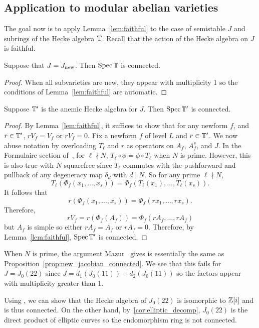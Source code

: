 \documentclass[11pt, proquest]{uwthesis}
\begin{document}
\subsection{Application to modular abelian varieties}

The goal now is to apply Lemma~\ref{lem:faithful} to the case of semistable
$J$ and subrings of the Hecke algebra $\mathbb{T}$. Recall that the action of the
Hecke algebra on $J$ is faithful.

\begin{proposition}\label{prop:new_jacobian_connected}
    Suppose that $J=J_{\operatorname{new}}$. Then $\operatorname{Spec}\mathbb{T}$ is connected.
\end{proposition}
\begin{proof}
    When all subvarieties are new, they appear with multiplicity 1 so the
    conditions of Lemma~\ref{lem:faithful} are automatic.
\end{proof}

\begin{proposition}
    Suppose $\mathbb{T}'$ is the anemic Hecke algebra for $J$. Then $\operatorname{Spec}\mathbb{T}'$ is
    connected.
\end{proposition}
\begin{proof}
    By Lemma~\ref{lem:faithful}, it suffices to show that for any newform
    $f$, and $r\in \mathbb{T}'$, $rV_f=V_f$ or $rV_f=0$. Fix a newform $f$ of level
    $L$ and $r\in \mathbb{T}'$. We now abuse notation by overloading $T_\ell$ and $r$
    as operators on $A_f$, $A_f^s$, and $J$. In the Formulaire section
    of~\cite{ribet:old}, for $\ell\nmid N$, $T_\ell\circ \phi=\phi\circ T_\ell$
    when $N$ is prime. However, this is also true with $N$ squarefree since
    $T_\ell$ commutes with the pushforward and pullback of any degeneracy map
    $\delta_d$ with $d\mid N$. So for any prime $\ell\nmid N$,
    \[
        T_\ell(\Phi_f(x_1,\ldots,x_s))
        = \Phi_f(T_\ell(x_1),\ldots,T_\ell(x_s)).
    \]
    It follows that
    \[
        r(\Phi_f(x_1,\ldots,x_s))
        = \Phi_f(rx_1,\ldots,rx_s).
    \]
    Therefore,
    \[
        rV_f = r(\Phi_f(A_f)) = \Phi_f(rA_f,\ldots,rA_f)
    \]
    but $A_f$ is simple so either $rA_f=A_f$ or $rA_f=0$. Therefore, by
    Lemma~\ref{lem:faithful}, $\operatorname{Spec}\mathbb{T}'$ is connected.
\end{proof}

\begin{example}
    When $N$ is prime, the argument Mazur~\cite[Prop. 10.6]{mazur:eisenstein}
    gives is essentially the same as
    Proposition~\ref{prop:new_jacobian_connected}. We see that this fails for
    $J=J_0(22)$ since $J=d_1(J_0(11))+d_2(J_0(11))$ so the factors appear with
    multiplicity greater than 1.

    Using \sage, we can show that the Hecke algebra of $J_0(22)$ is isomorphic
    to $\mathbb{Z}[i]$ and is thus connected. On the other hand,
    by~\ref{cor:elliptic_decomp}, $J_0(22)$ is the direct product of elliptic
    curves so the endomorphism ring is not connected.
\end{example}
\end{document}

